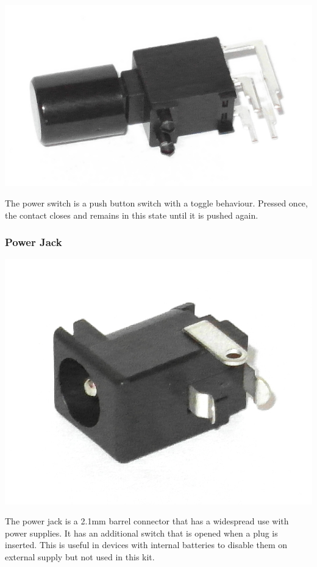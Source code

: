 \documentclass{scrartcl}
\begin{document}
\begin{center}
    \includegraphics[scale=0.15]{assets/zekit-power.jpg}
\end{center}

The power switch is a push button switch with a toggle behaviour. Pressed once, the contact closes and remains in this state until it is pushed again.

\subsubsection{Power Jack}

\begin{center}
    \includegraphics[scale=0.15]{assets/zekit-dcjack.jpg}
\end{center}

The power jack is a 2.1mm barrel connector that has a widespread use with power supplies. It has an additional switch that is opened when a plug is inserted. This is useful in devices with internal batteries to disable them on external supply but not used in this kit.
\end{document}
